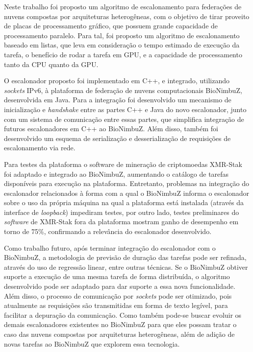 Neste trabalho foi proposto um algoritmo de escalonamento para federações de nuvens compostas por arquiteturas heterogêneas, com o objetivo de tirar proveito de placas de processamento gráfico, que possuem grande capacidade de processamento paralelo. Para tal, foi proposto um algoritmo de escalonamento baseado em listas, que leva em consideração o tempo estimado de execução da tarefa, o benefício de rodar a tarefa em \acrshort{GPU}, e a capacidade de processamento tanto da \acrshort{CPU} quanto da \acrshort{GPU}.

O escalonador proposto foi implementado em C++, e integrado, utilizando \textit{sockets} \acrshort{IP}v6, à plataforma de federação de nuvens computacionais BioNimbuZ, desenvolvida em Java. Para a integração foi desenvolvido um mecanismo de inicialização e \textit{handshake} entre as partes C++ e Java do novo escalonador, junto com um sistema de comunicação entre essas partes, que simplifica integração de futuros escalonadores em C++ ao BioNimbuZ. Além disso, também foi desenvolvido um esquema de serialização e desserialização de requisições de escalonamento via rede.

Para testes da plataforma o software de mineração de criptomoedas XMR-Stak foi adaptado e integrado ao BioNimbuZ, aumentando o catálogo de tarefas disponíveis para execução na plataforma. Entretanto, problemas na integração do escalonador relacionados à forma com a qual o BioNimbuZ informa o escalonador sobre o uso da própria máquina na qual a plataforma está instalada (através da interface de \textit{loopback}) impediram testes, por outro lado, testes preliminares do \textit{software} de XMR-Stak fora da plataforma mostram ganho de desempenho em torno de 75\%, confirmando a relevância do escalonador desenvolvido.


Como trabalho futuro, após terminar integração do escalonador com o BioNimbuZ, a metodologia de previsão de duração das tarefas pode ser refinada, através do uso de regressão linear, entre outras técnicas. Se o BioNimbuZ obtiver suporte a execução de uma mesma tarefa de forma distribuída, o algoritmo desenvolvido pode ser adaptado para dar suporte a essa nova funcionalidade. Além disso, o processo de comunicação por \textit{sockets} pode ser otimizado, pois atualmente as requisições são transmitidas em forma de texto legível, para facilitar a depuração da comunicação. Como também pode-se buscar evoluir os demais escalonadores existentes no BioNimbuZ para que eles possam tratar o caso das nuvens compostas por arquiteturas heterogêneas, além de adição de novas tarefas ao BioNimbuZ que explorem essa tecnologia.

